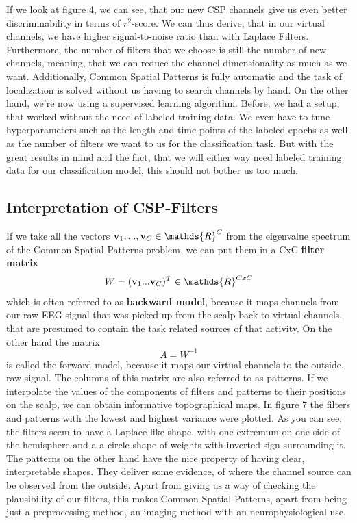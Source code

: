 \documentclass[12pt,twoside,twocolumn]{article}
\begin{document}
If we look at figure 4, we can see, that our new CSP channels give us even better discriminability in terms of $r^2$-score. We can thus derive, that in our virtual channels, we have higher signal-to-noise ratio than with Laplace Filters. Furthermore, the number of filters that we choose is still the number of new channels, meaning, that we can reduce the channel dimensionality as much as we want. Additionally, Common Spatial Patterns is fully automatic and the task of localization is solved without us having to search channels by hand. On the other hand, we're now using a supervised learning algorithm. Before, we had a setup, that worked without the need of labeled training data.  We even have to tune hyperparameters such as the length and time points of the labeled epochs as well as the number of filters we want to us for the classification task. But with the great results in mind and the fact, that we will either way need labeled training data for our classification model, this should not bother us too much.

\subsection{Interpretation of CSP-Filters}
If we take all the vectors ${\bf v}_1, ..., {\bf v}_C \in \mathds{R}^C$ from the eigenvalue spectrum of the Common Spatial Patterns problem, we can put them in a CxC {\bf filter matrix}
\begin{equation}
	W = ({\bf v}_1 ... {\bf v}_C)^T \in \mathds{R}^{CxC}
\end{equation}
which is often referred to as {\bf backward model}, because it maps channels from our raw EEG-signal that was picked up from the scalp back to virtual channels, that are presumed to contain the task related sources of that activity. On the other hand the matrix 
\begin{equation}
	A = W^{-1}
\end{equation}  
is called the forward model, because it maps our virtual channels to the outside, raw signal. The columns of this matrix are also referred to as patterns. If we interpolate the values of the components of filters and patterns to their positions on the scalp, we can obtain informative topographical maps. In figure 7 the filters and patterns with the lowest and highest variance were plotted. As you can see, the filters seem to have a Laplace-like shape, with one extremum on one side of the hemisphere and a a circle shape of weights with inverted sign surrounding it.
The patterns on the other hand have the nice property of having clear, interpretable shapes. They deliver some evidence, of where the channel source can be observed from the outside. Apart from giving us a way of checking the plausibility of our filters, this makes Common Spatial Patterns, apart from being just a preprocessing method, an imaging method with an neurophysiological use.
\end{document}
